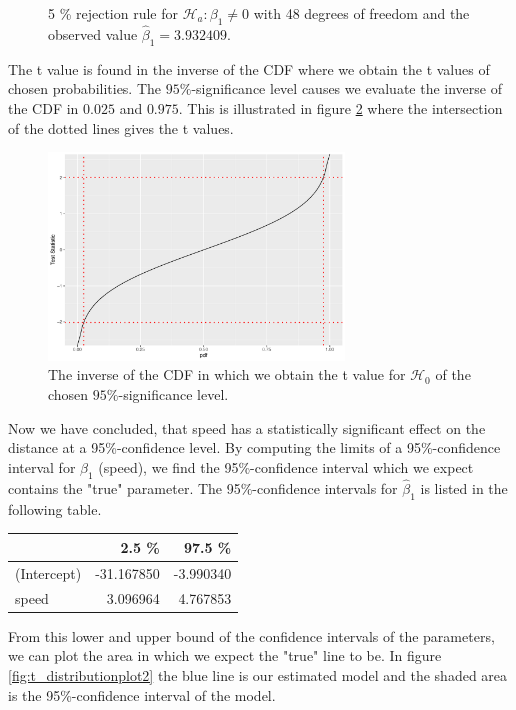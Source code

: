 \begin{example} 
\begin{figure}[H]
    \caption{5 \% rejection rule for $\mathcal{H}_a:\beta_1\neq0$ with 48 degrees of freedom and the observed value $\hat{\beta}_1=3.932409$.}
    \label{fig:t_distributionplot1}
\end{figure}
The t value is found in the inverse of the CDF where we obtain the t values of chosen probabilities. 
The $95\%$-significance level causes we evaluate the inverse of the CDF in $0.025$ and $0.975$. 
This is illustrated in figure \ref{fig:CDF_inverse} where the intersection of the dotted lines gives the t values.
\begin{figure}[H]
    \centering
    \includegraphics[width = 0.7\textwidth]{figures/Nanna/CDF_inverse.pdf}
    \caption{The inverse of the CDF in which we obtain the t value for $\mathcal{H}_0$ of the chosen $95\%$-significance level.}
    \label{fig:CDF_inverse}
\end{figure}
Now we have concluded, that speed has a statistically significant effect on the distance at a 95\%-confidence level. 
By computing the limits of a 95\%-confidence interval for $\hat{\beta}_1$ (speed), we find the 95\%-confidence interval which we expect contains the "true" parameter.
The 95\%-confidence intervals for $\hat{\beta}_1$ is listed in the following table.
\begin{table}[H]
\centering
\begin{tabular}{lrr}
\toprule
 & \textbf{2.5 \%} & \textbf{97.5 \%}\\
\midrule
(Intercept) & -31.167850 & -3.990340\\
speed & 3.096964 & 4.767853\\
\bottomrule
\end{tabular}
\end{table}
From this lower and upper bound of the confidence intervals of the parameters, we can plot the area in which we expect the "true" line to be. In figure \ref{fig:t_distributionplot2} the blue line is our estimated model and the shaded area is the 95\%-confidence interval of the model. 

\end{example}
